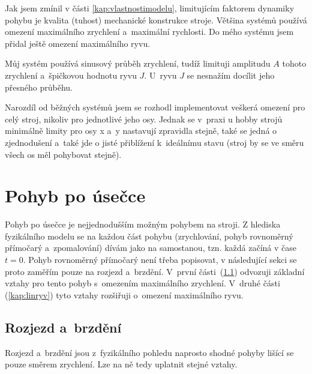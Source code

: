 	Jak jsem zmínil v části \ref{kap:vlastnostimodelu}, limitujícím faktorem dynamiky pohybu je kvalita (tuhost) mechanické konstrukce stroje. Většina systémů používá omezení maximálního zrychlení a~maximální rychlosti. Do mého systému jsem přidal ještě omezení maximálního ryvu.
	
	Můj systém používá sinusový průběh zrychlení, tudíž limituji amplitudu $A$ tohoto zrychlení a~špičkovou hodnotu ryvu $J$. U~ryvu $J$ se nesnažím docílit jeho přesného průběhu. 
	
	Narozdíl od běžných systémů jsem se rozhodl implementovat veškerá omezení pro celý stroj, nikoliv pro jednotlivé jeho osy. Jednak se v~praxi u hobby strojů minimálně limity pro osy x a~y nastavují zpravidla stejně, také se jedná o zjednodušení a~také jde o jisté přiblížení k~ideálnímu stavu (stroj by se ve směru všech os měl pohybovat stejně).
	
	\section{Pohyb po úsečce}\label{kap:pohybpousecce}
	Pohyb po úsečce je nejjednodušším možným pohybem na stroji.	Z hlediska fyzikálního modelu se na každou část pohybu (zrychlování, pohyb rovnoměrný přímočarý a~zpomalování) dívám jako na samostanou, tzn. každá začíná v čase $t=0$. Pohyb rovnoměrný přímočarý není třeba popisovat, v následující sekci se proto zaměřím pouze na rozjezd a~brzdění. V~první části~(\ref{kap:linrozbrzd}) odvozuji základní vztahy pro tento pohyb s~omezením maximálního zrychlení. V~druhé části (\ref{kap:linryv}) tyto vztahy rozšiřuji o~omezení maximálního ryvu.
	
		\subsection{Rozjezd a~brzdění}\label{kap:linrozbrzd}
		
		Rozjezd a~brzdění jsou z~fyzikálního pohledu naprosto shodné pohyby lišící se pouze směrem zrychlení. Lze na ně tedy uplatnit stejné vztahy.
		
